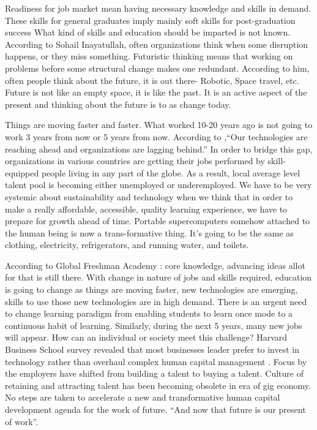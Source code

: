 \documentclass[
  12pt]{article}
\begin{document}
Readiness for job market mean having necessary knowledge and skills in
demand. These skills for general graduates imply mainly soft skills for
post-graduation success What kind of skills and education should be
imparted is not known. According to Sohail Inayatullah, often
organizations think when some disruption happens, or they miss
something. Futuristic thinking means that working on problems before
some structural change makes one redundant. According to him, often
people think about the future, it is out there- Robotic, Space travel,
etc. Future is not like an empty space, it is like the past. It is an
active aspect of the present and thinking about the future is to as
change today.

Things are moving faster and faster. What worked 10-20 years ago is not
going to work 3 years from now or 5 years from now. According to
\citet{Brynjolfsson2011RaceAT} ,``Our technologies are reaching ahead
and organizations are lagging behind.'' In order to bridge this gap,
organizations in various countries are getting their jobs performed by
skill-equipped people living in any part of the globe. As a result,
local average level talent pool is becoming either unemployed or
underemployed. We have to be very systemic about sustainability and
technology when we think that in order to make a really affordable,
accessible, quality learning experience, we have to prepare for growth
ahead of time. Portable supercomputers somehow attached to the human
being is now a trans-formative thing. It's going to be the same as
clothing, electricity, refrigerators, and running water, and toilets.

According to Global Freshman Academy : core knowledge, advancing ideas
allot for that is still there. With change in nature of jobs and skills
required, education is going to change as things are moving faster, new
technologies are emerging, skills to use those new technologies are in
high demand. There is an urgent need to change learning paradigm from
enabling students to learn once mode to a continuous habit of learning.
Similarly, during the next 5 years, many new jobs will appear. How can
an individual or society meet this challenge? Harvard Business School
survey revealed that most businesses leader prefer to invest in
technology rather than overhaul complex human capital management
\citet{PorterandRivkin2014} . Focus by the employers have shifted from
building a talent to buying a talent. Culture of retaining and
attracting talent has been becoming obsolete in era of gig economy. No
steps are taken to accelerate a new and transformative human capital
development agenda for the work of future. ``And now that future is our
present of work''.
\end{document}
